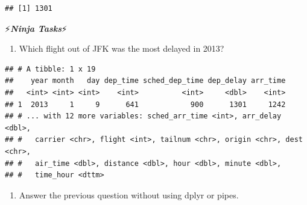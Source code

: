 \documentclass[]{article}
\newenvironment{Shaded}{\begin{snugshade}}{\end{snugshade}}
\newcommand{\KeywordTok}[1]{\textcolor[rgb]{0.13,0.29,0.53}{\textbf{#1}}}
\newcommand{\DataTypeTok}[1]{\textcolor[rgb]{0.13,0.29,0.53}{#1}}
\newcommand{\StringTok}[1]{\textcolor[rgb]{0.31,0.60,0.02}{#1}}
\newcommand{\OperatorTok}[1]{\textcolor[rgb]{0.81,0.36,0.00}{\textbf{#1}}}
\newcommand{\NormalTok}[1]{#1}
\providecommand{\tightlist}{%
  \setlength{\itemsep}{0pt}\setlength{\parskip}{0pt}}
\begin{document}
\begin{verbatim}
## [1] 1301
\end{verbatim}

⚡\textbf{\emph{Ninja Tasks}}⚡

\begin{enumerate}
\def\labelenumi{\arabic{enumi}.}
\tightlist
\item
  Which flight out of JFK was the most delayed in 2013?
\end{enumerate}

\begin{Shaded}
\end{Shaded}

\begin{verbatim}
## # A tibble: 1 x 19
##    year month   day dep_time sched_dep_time dep_delay arr_time
##   <int> <int> <int>    <int>          <int>     <dbl>    <int>
## 1  2013     1     9      641            900      1301     1242
## # ... with 12 more variables: sched_arr_time <int>, arr_delay <dbl>,
## #   carrier <chr>, flight <int>, tailnum <chr>, origin <chr>, dest <chr>,
## #   air_time <dbl>, distance <dbl>, hour <dbl>, minute <dbl>,
## #   time_hour <dttm>
\end{verbatim}

\begin{enumerate}
\def\labelenumi{\arabic{enumi}.}
\setcounter{enumi}{1}
\tightlist
\item
  Answer the previous question without using dplyr or pipes.
\end{enumerate}

\begin{Shaded}
\end{Shaded}
\end{document}
